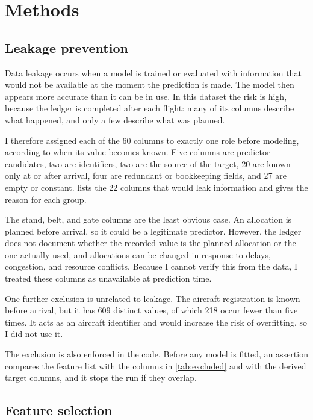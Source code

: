 \section{Methods}\label{sec:methods}

\subsection{Leakage prevention}\label{sec:leakage}

Data leakage occurs when a model is trained or evaluated with information that would not be available at the moment the prediction is made. The model then appears more accurate than it can be in use. In this dataset the risk is high, because the ledger is completed after each flight: many of its columns describe what happened, and only a few describe what was planned.

I therefore assigned each of the 60 columns to exactly one role before modeling, according to when its value becomes known. Five columns are predictor candidates, two are identifiers, two are the source of the target, 20 are known only at or after arrival, four are redundant or bookkeeping fields, and 27 are empty or constant.  lists the 22 columns that would leak information and gives the reason for each group.



The stand, belt, and gate columns are the least obvious case. An allocation is planned before arrival, so it could be a legitimate predictor. However, the ledger does not document whether the recorded value is the planned allocation or the one actually used, and allocations can be changed in response to delays, congestion, and resource conflicts. Because I cannot verify this from the data, I treated these columns as unavailable at prediction time.

One further exclusion is unrelated to leakage. The aircraft registration is known before arrival, but it has 609 distinct values, of which 218 occur fewer than five times. It acts as an aircraft identifier and would increase the risk of overfitting, so I did not use it.

The exclusion is also enforced in the code. Before any model is fitted, an assertion compares the feature list with the columns in \cref{tab:excluded} and with the derived target columns, and it stops the run if they overlap.

\subsection{Feature selection}\label{sec:features}


